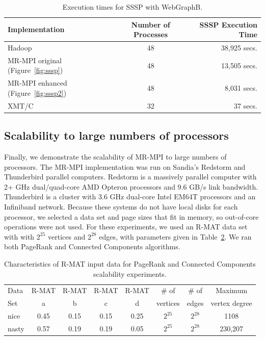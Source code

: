 \begin{table}
\begin{center}
\begin{tabular}{|l|c|r|}
\hline
Implementation & Number of Processes & SSSP Execution Time \\
\hline
Hadoop & 48  & 38,925 secs.\\
MR-MPI original (Figure~\ref{fig:sssp}) & 48 &  13,505 secs.\\
MR-MPI enhanced (Figure~\ref{fig:sssp2}) & 48 &  8,031 secs.\\
XMT/C  & 32 &  37 secs.\\
\hline
\end{tabular}
\caption{Execution times for SSSP with {WebGraphB}.}
\label{t:ssspB}
\end{center}
\end{table}



\subsection{Scalability to large numbers of processors}
Finally, we demonstrate the scalability of MR-MPI to large numbers of 
processors.  
The MR-MPI implementation was run on Sandia's Redstorm and Thunderbird
parallel computers.  Redstorm is a massively parallel computer with 2+ 
{GHz} dual/quad-core AMD Opteron processors and 9.6 GB/s link bandwidth.
Thunderbird is a cluster with 3.6 {GHz} dual-core Intel EM64T processors
and an Infiniband network.
Because these systems do not have local disks for each processor, we selected 
a data set and page sizes that fit in memory, so out-of-core operations
were not used.  For these experiments, we used an R-MAT data set with 
with $2^{25}$ vertices and $2^{28}$ edges, with parameters given in
Table~\ref{t:rmat}.  We ran both PageRank and Connected Components
algorithms.

\begin{table}
\begin{center}
\begin{tabular}{|l|c|c|c|c|c|c|c|}
\hline
Data & R-MAT  & R-MAT  & R-MAT  & R-MAT  & \# of    & \# of & Maximum \\
Set  & a      & b      & c      & d      & vertices & edges & vertex degree\\
\hline
nice  & 0.45 & 0.15 & 0.15 & 0.25 & $2^{25}$ & $2^{28}$ & 1108 \\
nasty & 0.57 & 0.19 & 0.19 & 0.05 & $2^{25}$ & $2^{28}$ & 230,207\\
\hline
\end{tabular}
\caption{Characteristics of R-MAT input data for PageRank and Connected
Components scalability experiments.}
\label{t:rmat}
\end{center}
\end{table}

